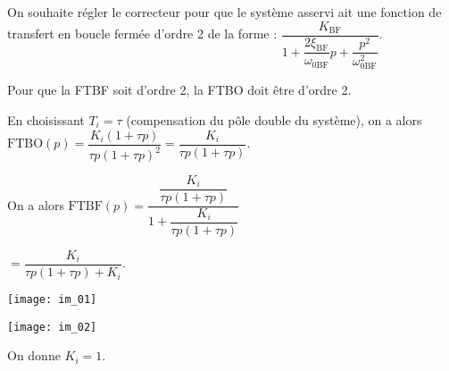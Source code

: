 \begin{multicols}{2}
\vspace{.25cm}

On souhaite régler le correcteur pour que le système asservi ait une fonction de transfert en boucle fermée
d’ordre 2 de la forme :
$\dfrac{K_{\text{BF}}}{1+\dfrac{2\xi_{\text{BF}}}{\omega_{0\text{BF}}}p+\dfrac{p^2}{\omega_{0\text{BF}}^2}}$.


\ifprof
\begin{corrige}
Pour que la FTBF soit d'ordre 2, la FTBO doit être d'ordre 2. 

En choisissant $T_i = \tau$ (compensation du pôle double du système), on a alors 
$\text{FTBO}(p)=\dfrac{K_i (1+\tau p)}{\tau p (1+\tau p)^2}=\dfrac{K_i }{\tau p (1+\tau p)}$.

On a alors 
$\text{FTBF}(p) = \dfrac{\dfrac{K_i }{\tau p (1+\tau p)}}{1+\dfrac{K_i }{\tau p (1+\tau p)}}$

$= \dfrac{K_i}{\tau p (1+\tau p)+K_i }$.

\end{corrige}
\else
\fi




\begin{center}
\texttt{[image: im\_01]}
\end{center}

\begin{center}
\texttt{[image: im\_02]}
\end{center}
%
%
%

%

On donne $K_i=1$. 




\end{multicols}
